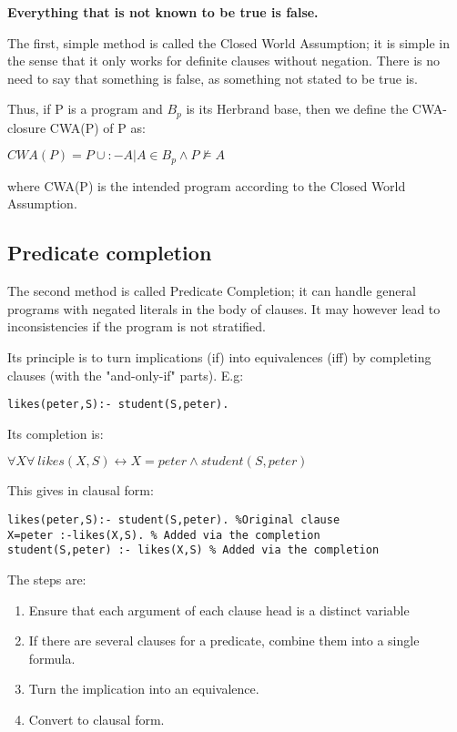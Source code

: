 \documentclass[12pt, oneside]{report}
\numberwithin{definition}{chapter}
\numberwithin{theorem}{chapter}
\numberwithin{lemma}{chapter}
\numberwithin{Rule}{chapter}
\numberwithin{equation}{chapter}
\begin{document}
\begin{displayquote}
\textbf{
Everything that is not known to be true is false.}
\end{displayquote}
The first, simple method is called the Closed World Assumption; it is simple in the sense that it only works for definite clauses without negation. There is no need to say that something is false, as something not stated to be true is.

Thus, if P is a program and $B_p$ is its Herbrand base, then we define the CWA-closure
CWA(P) of P as:
\begin{tcolorbox}
$
CWA(P) = P \cup {:-A | A \in B_p \wedge P \not\models A}
$
\end{tcolorbox}
where CWA(P) is the intended program according to the Closed World Assumption. 
\subsection{Predicate completion}
The second method is called Predicate Completion; it can handle general programs with negated literals in the body of clauses. It may however lead to inconsistencies if the program is not stratified.

Its principle is to turn implications (if) into equivalences (iff) by completing clauses (with the "and-only-if" parts).
E.g:
\begin{verbatim}
likes(peter,S):- student(S,peter).
\end{verbatim}
Its completion is:
\begin{tcolorbox}
$
\forall X\forall\ likes(X,S) \leftrightarrow X=peter \wedge student(S,peter)
$
\end{tcolorbox}
This gives in clausal form:
\begin{verbatim}
likes(peter,S):- student(S,peter). %Original clause
X=peter :-likes(X,S). % Added via the completion
student(S,peter) :- likes(X,S) % Added via the completion
\end{verbatim}

The steps are:
\begin{enumerate}
\item Ensure that each argument of each clause head is a distinct variable
\item If there are several clauses for a predicate, combine them into a single formula.
\item Turn the implication into an equivalence.
\item Convert to clausal form.
\end{enumerate}
\end{document}
